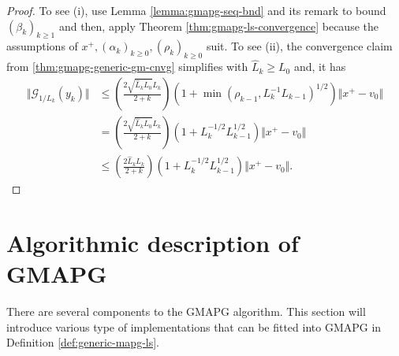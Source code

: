 \documentclass[12pt]{report}
\begin{document}
        \begin{proof}
            To see (i), use Lemma \ref{lemma:gmapg-seq-bnd} and its remark to bound $(\beta_k)_{k \ge 1}$ and then, apply Theorem \ref{thm:gmapg-ls-convergence} because the assumptions of $x^+, (\alpha_k)_{k \ge 0}, (\rho_k)_{k \ge 0}$ suit. 
            To see (ii), the convergence claim from \ref{thm:gmapg-generic-gm-cnvg} simplifies with $\widehat L_k \ge L_0$ and, it has 
            \begin{align}
                \Vert \mathcal G_{1/L_k}(y_k) \Vert
                &\le 
                \left(
                    \frac{2\sqrt{\widehat L_kL_0}L_k}{2 + k}
                \right)\left(
                    1 + \min(\rho_{k - 1}, L_k^{-1}L_{k - 1})^{1/2}
                \right)\Vert x^+ - v_0\Vert
                \\
                &= 
                \left(
                    \frac{2\sqrt{\widehat L_kL_0}L_k}{2 + k}
                \right)\left(
                    1 + L_k^{-1/2}L_{k - 1}^{1/2}
                \right)\Vert x^+ - v_0\Vert
                \\
                &\le 
                \left(
                    \frac{2\widehat L_k L_k}{2 + k}
                \right)\left(
                    1 + L_k^{-1/2}L_{k - 1}^{1/2}
                \right)\Vert x^+ - v_0\Vert. 
            \end{align}
        \end{proof}
    
    \section{Algorithmic description of GMAPG}
        There are several components to the GMAPG algorithm. 
        This section will introduce various type of implementations that can be fitted into GMAPG in Definition \ref{def:generic-mapg-ls}. 
\end{document}
